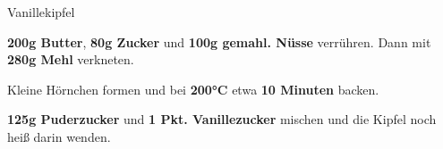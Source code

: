 \begin{recipe}[]{Vanillekipfel} %


\step
\textbf{200g Butter}, \textbf{80g Zucker} und \textbf{100g gemahl. Nüsse} verrühren. Dann mit \textbf{280g Mehl} verkneten.

\step
Kleine Hörnchen formen und bei \textbf{200°C} etwa \textbf{10 Minuten} backen.

\step
\textbf{125g Puderzucker} und \textbf{1 Pkt. Vanillezucker} mischen und die Kipfel noch heiß darin wenden.

\end{recipe}